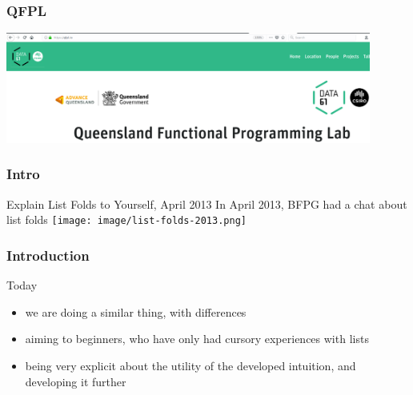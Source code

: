 \begin{frame}
\frametitle{QFPL}
\begin{center}
\includegraphics[width=0.9\textwidth]{image/qfpl_io.png}
\end{center}
\end{frame}

\begin{frame}
\frametitle{Intro}
\begin{block}{Explain List Folds to Yourself, April 2013}
In April 2013, BFPG had a chat about list folds
\texttt{[image: image/list-folds-2013.png]}
\end{block}
\end{frame}

\begin{frame}
\frametitle{Introduction}
\begin{block}{Today}
\begin{itemize}
\item<1-> we are doing a similar thing, with differences
\item<2-> aiming to beginners, who have only had cursory experiences with lists
\item<3-> being very explicit about the utility of the developed intuition, and developing it further
\end{itemize}
\end{block}
\end{frame}
